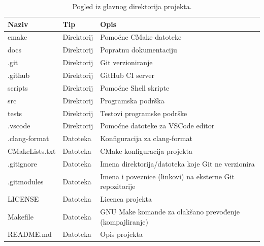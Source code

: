 \documentclass[times, utf8, diplomski, numeric]{templates/template}
\begin{document}
{{        \begin{table}[htb]
        \caption{Pogled iz glavnog direktorija projekta.}
        \label{tbl:pogled_iz_glavnog_direktorija}
        \centering
        \begin{tabular}{lll} 
        \toprule
        Naziv & Tip & Opis \\ 
        \midrule
        cmake           & Direktorij & Pomoćne CMake datoteke \\
        docs            & Direktorij & Popratnu dokumentaciju \\
        .git            & Direktorij & Git verzioniranje \\
        .github         & Direktorij & GitHub CI server \\
        scripts         & Direktorij & Pomoćne Shell skripte \\
        src             & Direktorij & Programska podrška \\
        tests           & Direktorij & Testovi programske podrške \\
        .vscode         & Direktorij & Pomoćne datoteke za VSCode editor \\
        .clang-format   & Datoteka   & Konfiguracija za clang-format \\
        CMakeLists.txt  & Datoteka   & CMake konfiguracija projekta \\
        .gitignore      & Datoteka   & Imena direktorija/datoteka koje Git ne verzionira \\
        .gitmodules     & Datoteka   & Imena i poveznice (linkovi) na eksterne Git repozitorije \\
        LICENSE         & Datoteka   & Licenca projekta \\
        Makefile        & Datoteka   & GNU Make komande za olakšano prevođenje (kompajliranje) \\
        README.md       & Datoteka   & Opis projekta \\
        \bottomrule
        \end{tabular}
        \end{table}

}}
\end{document}
